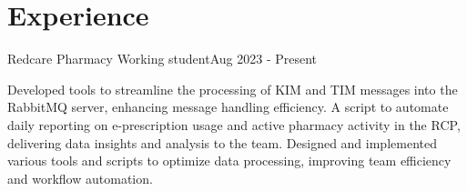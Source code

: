 \section{Experience}

\resumeHeading
{Redcare Pharmacy}
{Working student}{Aug 2023 - Present}

\resumeItemListStart
{}
{Developed tools to streamline the processing of KIM and TIM messages into the RabbitMQ server, enhancing message handling efficiency.}
{A script to automate daily reporting on e-prescription usage and active pharmacy activity in the RCP, delivering data insights and analysis to the team.}
{Designed and implemented various tools and scripts to optimize data processing, improving team efficiency and workflow automation.}
\resumeItemListEnd






